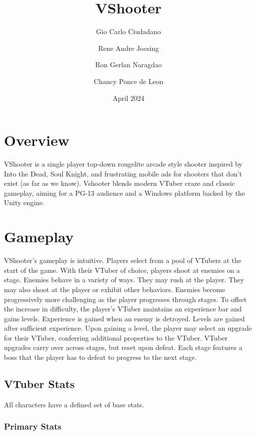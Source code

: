 \documentclass[10pt, a4paper]{article}
\title{\textbf{VShooter}}
\author{Gio Carlo Ciudadano \and Rene Andre Jocsing \and Ron Gerlan Naragdao \and Chancy Ponce de Leon}
\date{April 2024}
\begin{document}
\maketitle


\twocolumn

	\section{Overview}

	VShooter is a single player top-down rougelite arcade style shooter inspired by Into the Dead, Soul Knight, and frustrating mobile ads for shooters that don't exist (as far as we know). Vshooter blends modern VTuber craze and classic gameplay, aiming for a PG-13 audience and a Windows platform backed by the Unity engine.

  	\section{Gameplay}

	VShooter's gameplay is intuitive. Players select from a pool of VTubers at the start of the game. With their VTuber of choice, players shoot at enemies on a stage. Enemies behave in a variety of ways. They may rush at the player. They may also shoot at the player or exhibit other behaviors. Enemies become progressively more challenging as the player progresses through stages. To offset the increase in difficulty, the player's VTuber maintains an experience bar and gains levels. Experience is gained when an enemy is detroyed. Levels are gained after sufficient experience. Upon gaining a level, the player may select an upgrade for their VTuber, conferring additional properties to the VTuber. VTuber upgrades carry over across stages, but reset upon defeat. Each stage features a boss that the player has to defeat to progress to the next stage.
  	
  	\subsection{VTuber Stats} \label{Player Stats}
  	
  	All characters have a defined set of base stats.
  	
  	\subsubsection{Primary Stats}
\end{document}
